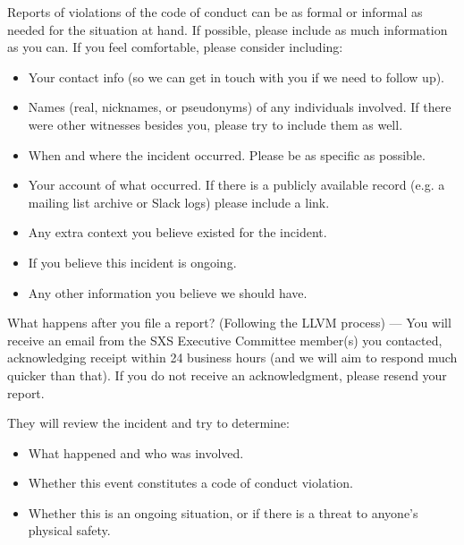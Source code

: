 Reports of violations of the code of conduct can be as formal or
informal as needed for the situation at hand. If possible, please
include as much information as you can. If you feel comfortable,
please consider including:
\begin{itemize} 
\item Your contact info (so we can get in touch with you if we need to
  follow up).
\item Names (real, nicknames, or pseudonyms) of any individuals
  involved. If there were other witnesses besides you, please try to
  include them as well.
\item When and where the incident occurred. Please be as specific as
  possible.
\item Your account of what occurred. If there is a publicly available
  record (e.g. a mailing list archive or Slack logs) please include a
  link.
\item Any extra context you believe existed for the incident.
\item If you believe this incident is ongoing.
\item Any other information you believe we should have.
\end{itemize}

What happens after you file a report? (Following the LLVM process) —
You will receive an email from the SXS Executive Committee member(s)
you contacted, acknowledging receipt within 24 business hours (and we
will aim to respond much quicker than that).  If you do not receive an
acknowledgment, please resend your report.

They will review the incident and try to determine: 
\begin{itemize}
\item What happened and who was involved.
\item Whether this event constitutes a code of conduct violation.
\item Whether this is an ongoing situation, or if there is a threat to
  anyone’s physical safety.
\end{itemize}

